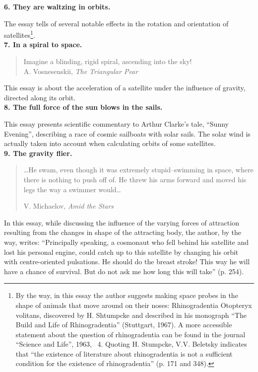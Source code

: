 \documentclass[12pt]{amsart}
\begin{document}
\noindent\textbf{6. They are waltzing in orbits.}

The essay tells of several notable effects in the rotation and orientation of
satellites\footnote{By the way, in this essay the author suggests making space
probes in the shape of animals that move around on their noses: Rhinogradentia
Otopteryx volitans, discovered by H. Shtumpcke and described in his monograph
``The Build and Life of Rhinogradentia'' (Stuttgart, 1967).
A more accessible statement about the question of rhinogradentia can be found in
the journal ``Science and Life'', 1963, \textnumero~4.
Quoting H. Stumpcke, V.V. Beletsky indicates that ``the existence of literature
about rhinogradentia is not a sufficient condition for the existence of
rhinogradentia'' (p. 171 and 348).}.\\

\noindent\textbf{7. In a spiral to space.}

\begin{quote}
Imagine a blinding, rigid spiral, ascending into the sky!\\

A. Vosnesenskii, \textit{The Triangular Pear}
\end{quote}

This essay is about the acceleration of a satellite under the influence of
gravity, directed along its orbit.\\

\noindent\textbf{8. The full force of the sun blows in the sails.}

This essay presents scientific commentary to Arthur Clarke's tale, ``Sunny
Evening'', describing a race of cosmic sailboats with solar sails.
The solar wind is actually taken into account when calculating orbits of some
satellites.\\

\noindent\textbf{9. The gravity flier.}

\begin{quote}
\indent\dots He swam, even though it was extremely stupid--swimming in space,
where there is nothing to push off of.
He threw his arms forward and moved his legs the way a swimmer would\dots

V. Michaelov, \textit{Amid the Stars}
\end{quote}

In this essay, while discussing the influence of the varying forces of
attraction resulting from the changes in shape of the attracting body, the
author, by the way, writes: ``Principally speaking, a cosmonaut who fell behind
his satellite and lost his personal engine, could catch up to this satellite by
changing his orbit with centre-oriented pulsations.
He should do the breast stroke!
This way he will have a chance of survival.
But do not ask me how long this will take'' (p. 254).
\end{document}
